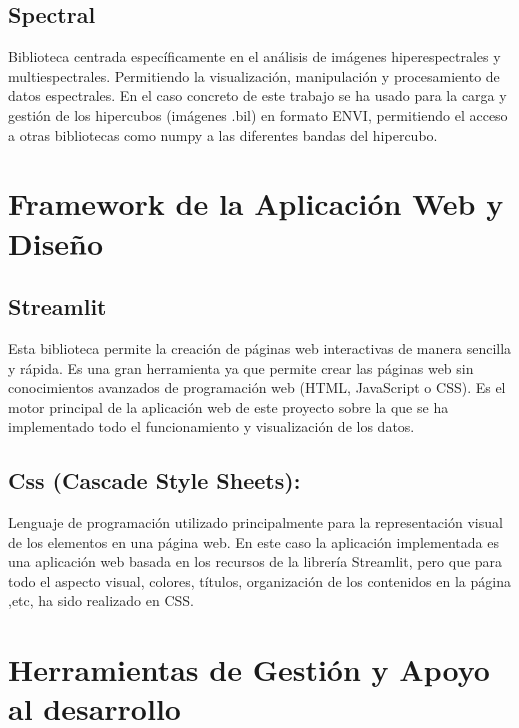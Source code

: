 \subsection{Spectral}
Biblioteca centrada específicamente en el análisis de imágenes hiperespectrales y multiespectrales. Permitiendo la visualización, manipulación y procesamiento de datos espectrales. En el caso concreto de este trabajo se ha usado para la carga y gestión de los hipercubos (imágenes .bil) en formato ENVI, permitiendo el acceso a otras bibliotecas como numpy a las diferentes bandas del hipercubo\cite{SpectralPython}.

\section{Framework de la Aplicación Web y Diseño}

 \subsection{Streamlit}
Esta biblioteca permite la creación de páginas web interactivas de manera sencilla y rápida. Es una gran herramienta ya que permite crear las páginas web sin conocimientos avanzados de programación web (HTML, JavaScript o CSS). Es el motor principal de la aplicación web de este proyecto sobre la que se ha implementado todo el funcionamiento y visualización de los datos\cite{Streamlit}.


 \subsection{Css (Cascade Style Sheets):}
Lenguaje de programación utilizado principalmente para la representación visual de los elementos en una página web\cite{alvarez2017manual}. En este caso la aplicación implementada es una aplicación web basada en los recursos de la librería Streamlit, pero que para todo el aspecto visual, colores, títulos, organización de los contenidos en la página ,etc, ha sido realizado en CSS.


\section{Herramientas de Gestión y Apoyo al desarrollo}

